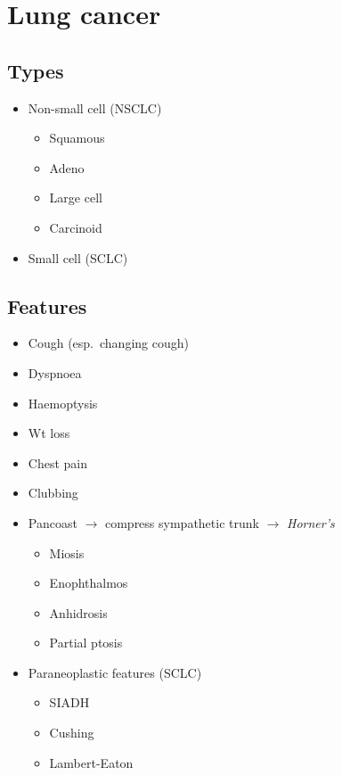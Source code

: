 \documentclass[
  14pt,
]{extarticle}
\providecommand{\tightlist}{%
  \setlength{\itemsep}{0pt}\setlength{\parskip}{0pt}}
\begin{document}
\pagebreak

\hypertarget{lung-cancer}{%
\section{Lung cancer}\label{lung-cancer}}

\hypertarget{types-1}{%
\subsection{Types}\label{types-1}}

\begin{itemize}
\tightlist
\item
  Non-small cell (NSCLC)

  \begin{itemize}
  \tightlist
  \item
    Squamous
  \item
    Adeno
  \item
    Large cell
  \item
    Carcinoid
  \end{itemize}
\item
  Small cell (SCLC)
\end{itemize}

\hypertarget{features}{%
\subsection{Features}\label{features}}

\begin{itemize}
\tightlist
\item
  Cough (esp.~changing cough)
\item
  Dyspnoea
\item
  Haemoptysis
\item
  Wt loss
\item
  Chest pain
\item
  Clubbing
\item
  Pancoast \(\rightarrow\) compress sympathetic trunk \(\rightarrow\)
  \emph{Horner's}

  \begin{itemize}
  \tightlist
  \item
    Miosis
  \item
    Enophthalmos
  \item
    Anhidrosis
  \item
    Partial ptosis
  \end{itemize}
\item
  Paraneoplastic features (SCLC)

  \begin{itemize}
  \tightlist
  \item
    SIADH
  \item
    Cushing
  \item
    Lambert-Eaton
  \end{itemize}
\end{itemize}
\end{document}
